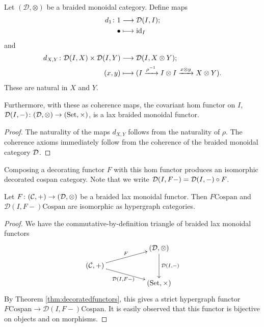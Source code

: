 \begin{proposition} \label{prop.monglobalsecs}
  Let $(\mathcal D, \otimes)$ be a braided monoidal category. Define maps  
  \begin{align*}
    d_1{\colon} 1 &\longrightarrow \mathcal D(I,I); \\
    \bullet &\longmapsto \mathrm{id}_I
  \end{align*}
  and
  \begin{align*}
    d_{X,Y} {\colon} \mathcal D(I,X) \times \mathcal D(I,Y) &\longrightarrow \mathcal D(I, X \otimes
    Y);\\
    (x,y) &\longmapsto (I \xrightarrow{\rho^{-1}} I \otimes I \xrightarrow{x \otimes y} X \otimes
    Y).
  \end{align*}
  These are natural in $X$ and $Y$. 

  Furthermore, with these as coherence maps, the covariant hom functor on $I$,
  $\mathcal D(I,-){\colon} (\mathcal D,\otimes) \to (\mathrm{Set},\times)$, is a lax braided monoidal
  functor. 
\end{proposition}
\begin{proof}
  The naturality of the maps $d_{X,Y}$ follows from the naturality of $\rho$.
  The coherence axioms immediately follow from the coherence of the braided
  monoidal category $\mathcal D$.
\end{proof}

Composing a decorating functor $F$ with this hom functor produces an isomorphic
decorated cospan category. Note that we write $\mathcal D(I,F-) = \mathcal D(I,-) \circ
F$.

\begin{proposition} \label{prop.setdecorations}
  Let $F{\colon} (\mathcal C, +) \to (\mathcal D, \otimes)$ be a braided lax
  monoidal functor. Then $F\mathrm{Cospan}$ and $\mathcal D(I,F-)\mathrm{Cospan}$ are isomorphic as hypergraph categories.
\end{proposition}
\begin{proof}
  We have the commutative-by-definition triangle of braided lax monoidal
  functors
  \[
    \xymatrixrowsep{2ex}
    \xymatrix{
      && (\mathcal D,\otimes) \ar[dd]^{\mathcal D(I,-)} \\
      (\mathcal C,+) \ar[urr]^{F} \ar[drr]_{\mathcal D(I,F-)} \\
      && (\Set, \times)
    }
  \]
  By Theorem \ref{thm:decoratedfunctors}, this gives a strict hypergraph functor
  $F\mathrm{Cospan} \to \mathcal D(I,F-)\mathrm{Cospan}$. It is easily
  observed that this functor is bijective on objects and on morphisms. 
\end{proof}

